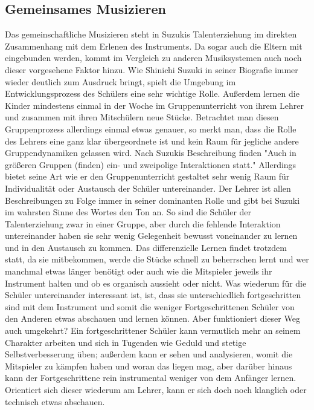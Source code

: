\subsection{Gemeinsames Musizieren}
Das gemeinschaftliche Musizieren steht in Suzukis Talenterziehung im direkten
Zusammenhang mit dem Erlenen des Instruments. Da sogar auch die Eltern mit
eingebunden werden, kommt im Vergleich zu anderen Musiksystemen auch noch dieser
vorgesehene Faktor hinzu. Wie Shinichi Suzuki in seiner Biografie immer wieder
deutlich zum Ausdruck bringt, spielt die Umgebung im Entwicklungsprozess des
Schülers eine sehr wichtige Rolle. Außerdem lernen die Kinder mindestens einmal in der
Woche im Gruppenunterricht von ihrem Lehrer und zusammen mit ihren Mitschülern
neue Stücke. Betrachtet man diesen Gruppenprozess allerdings einmal etwas
genauer, so merkt man, dass die Rolle des Lehrers eine ganz klar übergeordnete
ist und kein Raum für jegliche andere Gruppendynamiken gelassen wird. Nach
Suzukis Beschreibung finden "Auch in größeren Gruppen (finden) ein- und zweipolige
Interaktionen statt." \autocite[30]{suzuki:erziehung_ist_liebe}
Allerdings bietet seine Art wie er den Gruppenunterricht gestaltet sehr wenig
Raum für Individualität oder Austausch der Schüler untereinander. Der Lehrer ist
allen Beschreibungen zu Folge immer in seiner dominanten Rolle und gibt bei
Suzuki im wahrsten Sinne des Wortes den Ton an.
So sind
die Schüler der Talenterziehung zwar in einer Gruppe, aber durch die fehlende
Interaktion untereinander haben sie sehr wenig Gelegenheit bewusst voneinander
zu lernen und in den Austausch zu kommen. Das differenzielle Lernen findet
trotzdem statt, da sie mitbekommen, werde die Stücke schnell zu beherrschen
lernt und wer manchmal etwas länger benötigt oder auch wie die Mitspieler
jeweils ihr Instrument halten und ob es organisch aussieht oder nicht. Was
wiederum für die Schüler untereinander interessant ist, ist, dass sie
unterschiedlich fortgeschritten sind mit dem Instrument und somit die weniger
Fortgeschrittenen Schüler von den Anderen etwas abschauen und lernen können.
Aber funktioniert dieser Weg auch umgekehrt? Ein fortgeschrittener Schüler kann
vermutlich mehr an seinem Charakter arbeiten und sich in Tugenden wie Geduld und
stetige Selbstverbesserung üben; außerdem kann er sehen und analysieren, womit die Mitspieler zu
kämpfen haben und woran das liegen mag, aber darüber hinaus kann der
Fortgeschrittene rein instrumental
weniger von dem Anfänger lernen. Orientiert sich dieser wiederum am Lehrer, kann
er sich doch noch klanglich oder technisch etwas abschauen.
